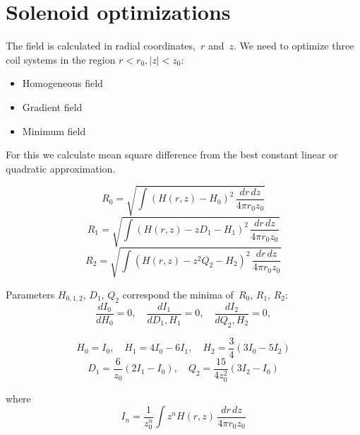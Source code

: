 \documentclass[a4paper]{article}
\begin{document}
\section {Solenoid optimizations}

The field is calculated in radial coordinates,~$r$ and~$z$.
We need to optimize three coil systems in the region $r<r_0, |z|<z_0$:
\begin{itemize}
\item Homogeneous field
\item Gradient field
\item Minimum field
\end{itemize}
For this we calculate mean square difference from the best
constant linear or quadratic approximation.

$$ R_0 = \sqrt{\int(H(r,z) - H_0)^2\,\frac{dr\,dz}{4\pi r_0 z_0}}
$$
$$ R_1 = \sqrt{\int(H(r,z) - z D_1 - H_1)^2\,\frac{dr\,dz}{4\pi r_0 z_0}}
$$
$$ R_2 = \sqrt{\int(H(r,z) - z^2 Q_2 - H_2)^2\,\frac{dr\,dz}{4\pi r_0 z_0}}
$$

Parameters $H_{0,1,2}$, $D_1$, $Q_2$ correspond the minima of~$R_0$,
$R_1$, $R_2$:
$$
\frac{d I_0}{dH_0} = 0,\quad
\frac{d I_1}{dD_1, H_1} = 0,\quad
\frac{d I_2}{dQ_2, H_2} = 0,
$$


$$
H_0 = I_0, \quad
H_1 = 4 I_0 - 6 I_1, \quad
H_2 = \frac{3}{4}(3 I_0 - 5 I_2)
$$
$$
D_1 = \frac{6}{z_0} (2 I_1 - I_0), \quad
Q_2 = \frac{15}{4z_0^2} (3 I_2 - I_0)
$$

where
$$
I_n = \frac{1}{z_0^n} \int z^n H(r,z)\,\frac{dr\,dz}{4\pi r_0 z_0}
$$
\end{document}
